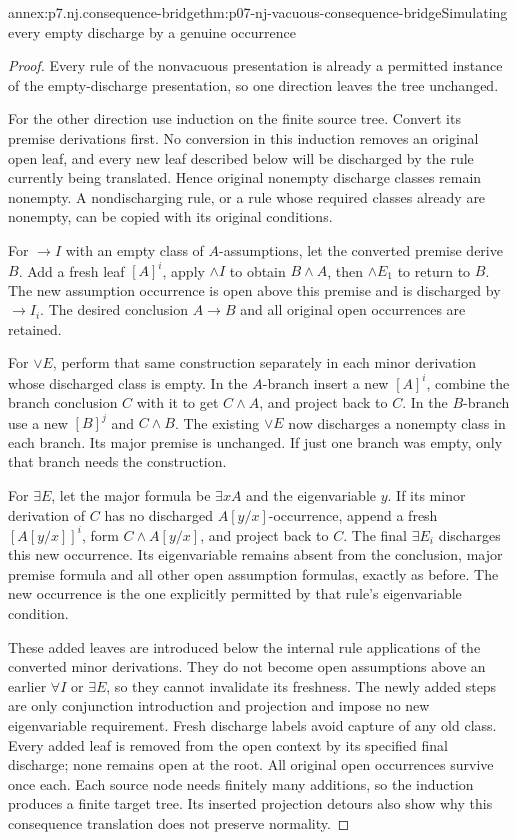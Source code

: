 \begin{annexitem}{annex:p7.nj.consequence-bridge}{thm:p07-nj-vacuous-consequence-bridge}{Simulating every empty discharge by a genuine occurrence}
\begin{proof}
Every rule of the nonvacuous presentation is already a permitted
instance of the empty-discharge presentation, so one direction
leaves the tree unchanged.

For the other direction use induction on the finite source tree.
Convert its premise derivations first. No conversion in this
induction removes an original open leaf, and every new leaf
described below will be discharged by the rule currently being
translated. Hence original nonempty discharge classes remain
nonempty. A nondischarging rule, or a rule whose required classes
already are nonempty, can be copied with its original conditions.

For \(\to I\) with an empty class of \(A\)-assumptions,
let the converted premise derive \(B\). Add a fresh leaf
\([A]^i\), apply \(\land I\) to obtain \(B\land A\),
then \(\land E_1\) to return to \(B\). The new assumption
occurrence is open above this premise and is discharged by
\(\to I_i\). The desired conclusion \(A\to B\) and all
original open occurrences are retained.

For \(\lor E\), perform that same construction separately
in each minor derivation whose discharged class is empty.
In the \(A\)-branch insert a new \([A]^i\), combine the
branch conclusion \(C\) with it to get \(C\land A\),
and project back to \(C\). In the \(B\)-branch use a new
\([B]^j\) and \(C\land B\). The existing \(\lor E\)
now discharges a nonempty class in each branch. Its major
premise is unchanged. If just one branch was empty, only
that branch needs the construction.

For \(\exists E\), let the major formula be \(\exists x A\)
and the eigenvariable \(y\). If its minor derivation of
\(C\) has no discharged \(A[y/x]\)-occurrence, append a
fresh \([A[y/x]]^i\), form \(C\land A[y/x]\), and project
back to \(C\). The final \(\exists E_i\) discharges this
new occurrence. Its eigenvariable remains absent from the
conclusion, major premise formula and all other open assumption
formulas, exactly as before. The new occurrence is the one
explicitly permitted by that rule's eigenvariable condition.

These added leaves are introduced below the internal rule
applications of the converted minor derivations. They do not
become open assumptions above an earlier \(\forall I\)
or \(\exists E\), so they cannot invalidate its freshness.
The newly added steps are only conjunction introduction and
projection and impose no new eigenvariable requirement.
Fresh discharge labels avoid capture of any old class.
Every added leaf is removed from the open context by its
specified final discharge; none remains open at the root.
All original open occurrences survive once each. Each source
node needs finitely many additions, so the induction produces
a finite target tree. Its inserted projection detours also
show why this consequence translation does not preserve normality.
\end{proof}
\end{annexitem}

